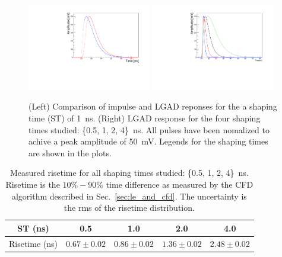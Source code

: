 \documentclass[preprint,1p]{elsarticle}
\begin{document}
\begin{figure}[htbp]
  \centering
  \includegraphics[width=0.48\textwidth]{figs/impulse_vs_lgad_response_1ens_shaping.pdf} \hfill
  \includegraphics[width=0.48\textwidth]{figs/lgad_all_shaping_time_noiseless.pdf}
  \caption{(Left) Comparison of impulse and LGAD reponses for the a shaping time (ST) of 1~\si{ns}.
  (Right) LGAD response for the four shaping times studied: \{0.5, 1, 2, 4\}~\si{ns}. All pulses have been nomalized
  to achive a peak amplitude of 50~\si{mV}. Legends for the shaping times are shown in the plots.}
  \label{fig:ir_and_lgad}
\end{figure}


\begin{table}\label{tab:risetime}
  \begin{center}
    \begin{tabular}{c|cccc}
    ST (ns) & 0.5  & 1.0 & 2.0 & 4.0 \\\hline
    Risetime (ns) & $0.67\pm 0.02$ & $0.86\pm 0.02$ & $1.36\pm 0.02$ & $2.48\pm 0.02$ \\
    \end{tabular}
    \caption{Measured risetime for all shaping times studied: \{0.5, 1, 2, 4\}~\si{ns}. Risetime is the $10\% - 90\%$ time
    difference as measured by the CFD algorithm described in Sec.~\ref{sec:le_and_cfd}. The uncertainty is the rms of the
    risetime distribution.}
  \end{center}
 \end{table}
\end{document}
